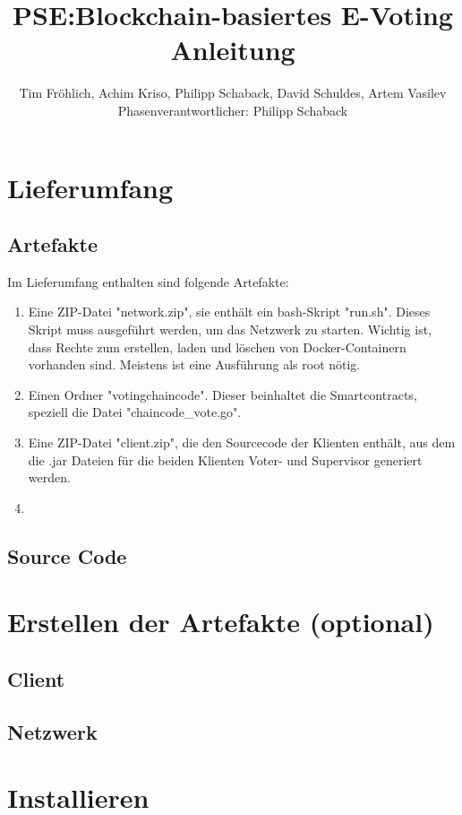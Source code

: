 \documentclass[parskip=full]{scrartcl}
\title{
	PSE:Blockchain-basiertes E-Voting \\
	Anleitung
}
\author{Tim Fröhlich, Achim Kriso, Philipp Schaback, David Schuldes, Artem Vasilev\\ Phasenverantwortlicher: Philipp Schaback}
\begin{document}
	\clearpage
	\maketitle
	\newpage
	
	\tableofcontents
	\newpage
	
	\section{Lieferumfang}
	\subsection{Artefakte}
	Im Lieferumfang enthalten sind folgende Artefakte:
	\begin{enumerate}
		\item Eine ZIP-Datei "network.zip", sie enthält ein bash-Skript "run.sh". Dieses Skript muss ausgeführt werden, um das Netzwerk zu starten. Wichtig ist, dass Rechte zum erstellen, laden und löschen von Docker-Containern vorhanden sind. Meistens ist eine Ausführung als root nötig.
		\item Einen Ordner "votingchaincode". Dieser beinhaltet die Smartcontracts, speziell die Datei "chaincode_vote.go".
		\item Eine ZIP-Datei "client.zip", die den Sourcecode der Klienten enthält, aus dem die .jar Dateien für die beiden Klienten Voter- und Supervisor generiert werden.
		\item 
	\end{enumerate}

	\subsection{Source Code}
	
	
	\section{Erstellen der Artefakte (optional)}
	\subsection{Client}
	
	\subsection{Netzwerk}
	
	
	\section{Installieren}
\end{document}
